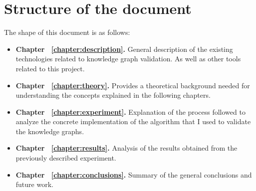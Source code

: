 \section{Structure of the document}

The shape of this document is as follows:

\begin{itemize}
    \item \textbf{Chapter ~\ref{chapter:description}.} General description of the existing technologies related to knowledge graph validation. As well as other tools related to this project.
    \item \textbf{Chapter ~\ref{chapter:theory}.} Provides a theoretical background needed for understanding the concepts explained in the following chapters.
    \item \textbf{Chapter ~\ref{chapter:experiment}.} Explanation of the process followed to analyze the concrete implementation of the algorithm that I used to validate the knowledge graphs.
    \item \textbf{Chapter ~\ref{chapter:results}.} Analysis of the results obtained from the previously described experiment.
    \item \textbf{Chapter ~\ref{chapter:conclusions}.} Summary of the general conclusions and future work.
\end{itemize}